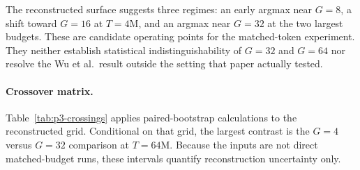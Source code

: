 \documentclass{article}
\begin{document}
The reconstructed surface suggests three regimes: an early argmax near
$G{=}8$, a shift toward $G{=}16$ at $T{=}4$M, and an argmax near $G{=}32$ at
the two largest budgets.  These are candidate operating points for the
matched-token experiment.  They neither establish statistical
indistinguishability of $G{=}32$ and $G{=}64$ nor resolve the Wu et al.\ result
outside the setting that paper actually tested.

\paragraph{Crossover matrix.}
Table~\ref{tab:p3-crossings} applies paired-bootstrap calculations to the
reconstructed grid.  Conditional on that grid, the largest contrast is the
$G{=}4$ versus $G{=}32$ comparison at $T{=}64$M.  Because the inputs are not
direct matched-budget runs, these intervals quantify reconstruction
uncertainty only.

\begin{table}[h!]
\centering
\caption{Conditional $\Delta_\text{pp}=\text{acc}(G_b)-\text{acc}(G_a)$ in the
reconstructed Qwen3-8B/GSM8K grid; $T_\text{cross}$ is an interpolated
threshold, not an observed training transition.}
\label{tab:p3-crossings}
\small
{}
\end{table}
\end{document}
